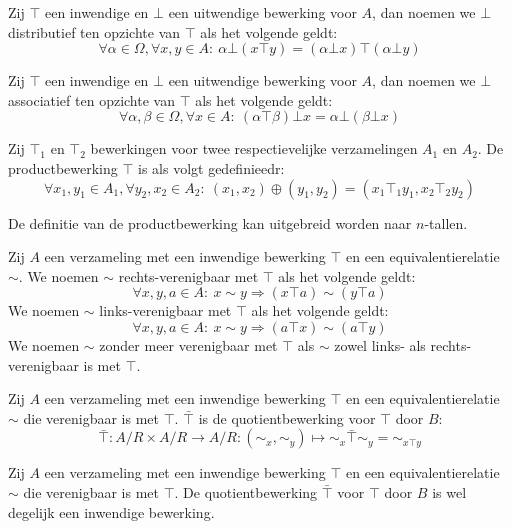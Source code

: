 \documentclass[main.tex]{subfiles}
\begin{document}
\begin{de}
  Zij $\top$ een inwendige en $\bot$ een uitwendige bewerking voor $A$, dan noemen we $\bot$ distributief ten opzichte van $\top$ als het volgende geldt:
  \[ \forall \alpha \in \Omega, \forall x,y \in A:\ \alpha\bot(x\top y) = (\alpha \bot x)\top(\alpha \bot y) \]
\end{de}

\begin{de}
  Zij $\top$ een inwendige en $\bot$ een uitwendige bewerking voor $A$, dan noemen we $\bot$ associatief ten opzichte van $\top$ als het volgende geldt:
  \[ \forall \alpha,\beta\in \Omega, \forall x \in A:\ (\alpha \top \beta) \bot x = \alpha \bot (\beta \bot x) \]
\end{de}

\begin{de}
  Zij $\top_{1}$ en $\top_{2}$ bewerkingen voor twee respectievelijke verzamelingen $A_{1}$ en $A_{2}$.
  De productbewerking $\top$ is als volgt gedefinieedr:
  \[ \forall x_{1},y_{1} \in A_{1}, \forall y_{2},x_{2} \in A_{2}:\ (x_{1},x_{2}) \oplus (y_{1},y_{2}) = (x_{1}\top_{1}y_{1}, x_{2}\top_{2} y_{2}) \]
\end{de}

\begin{opm}
  De definitie van de productbewerking kan uitgebreid worden naar $n$-tallen.
\end{opm}

\begin{de}
  Zij $A$ een verzameling met een inwendige bewerking $\top$ en een equivalentierelatie $\sim$.
  We noemen $\sim$ rechts-verenigbaar met $\top$ als het volgende geldt:
  \[ \forall x,y,a \in A:\ x\sim y \Rightarrow (x\top a) \sim (y \top a) \]
  We noemen $\sim$ links-verenigbaar met $\top$ als het volgende geldt:
  \[ \forall x,y,a \in A:\ x\sim y \Rightarrow (a\top x) \sim (a \top y) \]
  We noemen $\sim$ zonder meer verenigbaar met $\top$ als $\sim$ zowel links- als rechts-verenigbaar is met $\top$. 
\end{de}

\begin{de}
    Zij $A$ een verzameling met een inwendige bewerking $\top$ en een equivalentierelatie $\sim$ die verenigbaar is met $\top$.
    $\bar{\top}$ is de quotientbewerking voor $\top$ door $B$:
  \[ \bar{\top}: A/R \times A/R \rightarrow A/R: (\sim_{x},\sim_{y}) \mapsto \sim_{x} \bar{\top} \sim_{y} = \sim_{x\top y} \]
\end{de}
 
\begin{st}
    Zij $A$ een verzameling met een inwendige bewerking $\top$ en een equivalentierelatie $\sim$ die verenigbaar is met $\top$.
    De quotientbewerking $\bar{\top}$ voor $\top$ door $B$ is wel degelijk een inwendige bewerking.
 
\end{st}
\end{document}

